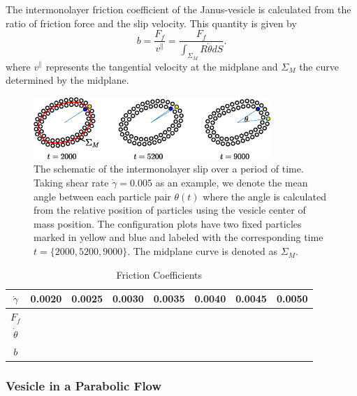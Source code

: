 \documentclass[lineno]{jfm}
\begin{document}


The intermonolayer friction coefficient of the Janus-vesicle is calculated from the ratio of friction force and the 
slip velocity. This quantity is given by 
\begin{equation}
b = \frac{F_f}{v^\parallel} = \frac{F_f}{\int_{\Sigma_M} R \dot\theta dS}.
\end{equation}
%
where $v^\parallel$ represents the tangential velocity at the midplane and $\Sigma_M$ the curve determined by the midplane.


\begin{figure}
\begin{center}
\includegraphics[width=0.8\textwidth]{Slip.eps}
\end{center} 
  \caption{The schematic of the intermonolayer slip over a period of time. Taking shear rate $\dot\gamma=0.005$ as an example, we denote the mean angle between each particle pair $\theta(t)$ where the angle is calculated from the relative position of particles using the vesicle center of mass position. The configuration plots have two fixed particles marked in yellow and blue and labeled with the corresponding time $t=\{2000,5200,9000\}$. The midplane curve is denoted as $\Sigma_M$.
  }
    \label{figure5}
\end{figure}


\begin{table}
\caption{Friction Coefficients}
\centering    
\begin{tabular}{c c c c c c c c }
\hline                    
$\dot\gamma$ & 0.0020 & 0.0025 & 0.0030 & 0.0035 & 0.0040 & 0.0045 & 0.0050\\
\hline 
$F_{f}$ &  &  &  &  &  &  &   \\[1ex]
$\dot\theta$             &  &  &  &  &  &  & \\ [1ex]
$b$             &  &  &  &  &  &  & \\ 
\hline    
\end{tabular} 
\label{table1}
\end{table}


\subsubsection{Vesicle in a Parabolic Flow}
\end{document}
